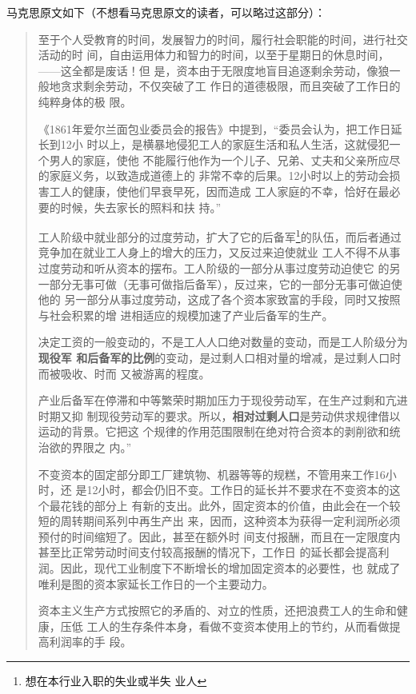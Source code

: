 马克思原文如下（不想看马克思原文的读者，可以略过这部分）：
\begin{quotation}
  至于个人受教育的时间，发展智力的时间，履行社会职能的时间，进行社交活动的时
  间，自由运用体力和智力的时间，以至于星期日的休息时间，——这全都是废话！但
  是，资本由于无限度地盲目追逐剩余劳动，像狼一般地贪求剩余劳动，不仅突破了工
  作日的道德极限，而且突破了工作日的纯粹身体的极
  限。

  《1861年爱尔兰面包业委员会的报告》中提到，“委员会认为，把工作日延长到12小
  时以上，是横暴地侵犯工人的家庭生活和私人生活，这就侵犯一个男人的家庭，使他
  不能履行他作为一个儿子、兄弟、丈夫和父亲所应尽的家庭义务，以致造成道德上的
  非常不幸的后果。12小时以上的劳动会损害工人的健康，使他们早衰早死，因而造成
  工人家庭的不幸，恰好在最必要的时候，失去家长的照料和扶
  持。”

  工人阶级中就业部分的过度劳动，扩大了它的后备军\footnote{想在本行业入职的失业或半失
    业人}的队伍，而后者通过竞争加在就业工人身上的增大的压力，又反过来迫使就业
  工人不得不从事过度劳动和听从资本的摆布。工人阶级的一部分从事过度劳动迫使它
  的另一部分无事可做（无事可做指后备军），反过来，它的一部分无事可做迫使他的
  另一部分从事过度劳动，这成了各个资本家致富的手段，同时又按照与社会积累的增
  进相适应的规模加速了产业后备军的生产。

  决定工资的一般变动的，不是工人人口绝对数量的变动，而是工人阶级分为\textbf{现役军
    和后备军的比例}的变动，是过剩人口相对量的增减，是过剩人口时而被吸收、时而
  又被游离的程度。

  产业后备军在停滞和中等繁荣时期加压力于现役劳动军，在生产过剩和亢进时期又抑
  制现役劳动军的要求。所以，\textbf{相对过剩人口}是劳动供求规律借以运动的背景。它把这
  个规律的作用范围限制在绝对符合资本的剥削欲和统治欲的界限之
  内。”

  不变资本的固定部分即工厂建筑物、机器等等的规糕，不管用来工作16小时，还
  是12小时，都会仍旧不变。工作日的延长并不要求在不变资本的这个最花钱的部分上
  有新的支出。此外，固定资本的价值，由此会在一个较短的周转期间系列中再生产出
  来，因而，这种资本为获得一定利润所必须预付的时间缩短了。因此，甚至在额外时
  间支付报酬，而且在一定限度内甚至比正常劳动时间支付较高报酬的情况下，工作日
  的延长都会提高利润。因此，现代工业制度下不断增长的增加固定资本的必要性，也
  就成了唯利是图的资本家延长工作日的一个主要动力。

  资本主义生产方式按照它的矛盾的、对立的性质，还把浪费工人的生命和健康，压低
  工人的生存条件本身，看做不变资本使用上的节约，从而看做提高利润率的手
  段。
\end{quotation}


